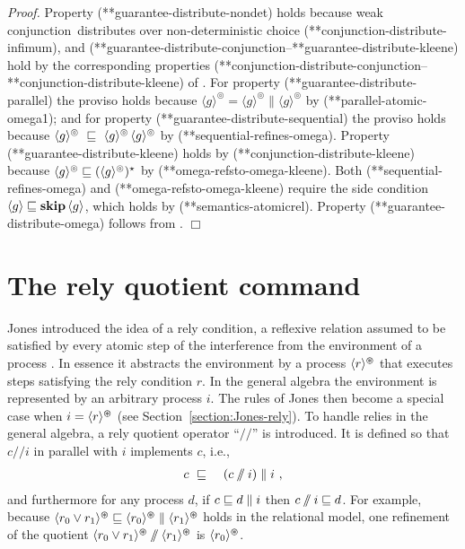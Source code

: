 \documentclass[fleqn]{fac}
\makeatletter
\renewenvironment{proof}{\noindent \textit{Proof.}}{\noindent$\Box$\par}
\def\refaxiom{\@ifnextchar*{\@refaxiom}{\@@refaxiom}}
\def\@refaxiom*#1{\ref{axiom-#1}\index{Axiom!#1|LawUse}}
\def\@@refaxiom#1{axiom~(\ref{axiom-#1})\index{Axiom!#1|LawUse}}
\def\refproperty{\@ifnextchar*{\@refproperty}{\@@refproperty}}
\def\@refproperty*#1{\ref{property-#1}\index{Property!#1|LawUse}}
\def\@@refproperty#1{property~(\ref{property-#1})\index{Property!#1|LawUse}}
\newcommand{\SSeq}{\,}
\newcommand{\atomicrel}[1]{\langle#1\rangle}
\newcommand{\FinSkipIter}{^{\varoast}}
\newcommand{\FinGuar}[1]{\atomicrel{#1}\FinSkipIter}
\newcommand{\omegaskip}{\circledcirc}
\newcommand{\InfSkipIter}{^{\omegaskip}}
\newcommand{\InfGuar}[1]{\atomicrel{#1}\InfSkipIter}
\newcommand{\strictconjunction}{weak conjunction}
\newcommand{\quotient}{\mathbin{/\!\!/}}
\newcommand{\Keyword}[1]{\mathsf{\mathbf{#1}}}
\newcommand{\FinIter}{^{\star}}
\newcommand{\Skip}{\Keyword{skip}}
\makeatother
\begin{document}
\begin{proof}
Property (\refproperty*{guarantee-distribute-nondet}) holds because \strictconjunction\ distributes over non-deterministic choice 
(\refaxiom*{conjunction-distribute-infimum}),
and (\refproperty*{guarantee-distribute-conjunction}--\refproperty*{guarantee-distribute-kleene}) 
hold by the corresponding properties (\refproperty*{conjunction-distribute-conjunction}--\refproperty*{conjunction-distribute-kleene}) of .
For property (\refproperty*{guarantee-distribute-parallel}) the proviso holds 
because $\InfGuar{g} = \InfGuar{g} \parallel \InfGuar{g}$
by (\refproperty*{parallel-atomic-omega1});
and
for property (\refproperty*{guarantee-distribute-sequential}) the proviso holds because
$\InfGuar{g} ~\refsto~ \InfGuar{g} \SSeq \InfGuar{g}$
by (\refproperty*{sequential-refines-omega}).
Property (\refproperty*{guarantee-distribute-kleene}) holds by (\refproperty*{conjunction-distribute-kleene}) 
because $\InfGuar{g} \refsto (\InfGuar{g})\FinIter$ by (\refproperty*{omega-refsto-omega-kleene}).
Both (\refproperty*{sequential-refines-omega}) and (\refproperty*{omega-refsto-omega-kleene})
require the side condition $\atomicrel{g} \refsto \Skip \SSeq \atomicrel{g}$,
which holds by (\refproperty*{semantics-atomicrel}).
Property (\refproperty*{guarantee-distribute-omega}) follows from .
\end{proof}






\section{The rely quotient command}\label{section:rely}

Jones introduced the idea of a rely condition,
a reflexive relation assumed to be satisfied by 
every atomic step of the interference from the environment of a process \cite{jon83a}.
In essence it abstracts the environment by a process $\FinGuar{r}$ 
that executes steps satisfying the rely condition $r$.
In the general algebra the environment is represented by an arbitrary process $i$.
The rules of Jones then become a special case 
when $i = \FinGuar{r}$ (see Section~\ref{section:Jones-rely}).
To handle relies in the general algebra, a rely quotient operator ``$\quotient$'' is introduced.
It is defined so that $c \quotient i$ in parallel with $i$ implements $c$,
i.e.,
\begin{eqnarray}\label{rely-motivation}
  c & ~\refsto~ & (c \quotient i) \parallel i~,
\end{eqnarray}
and furthermore for any process $d$, if $c \mathrel{\sqsubseteq} d \parallel i$ then $c \quotient i \refsto d$.
For example, because $\FinGuar{r_0 \lor r_1} \refsto \FinGuar{r_0} \parallel \FinGuar{r_1}$
holds in the relational model,
one refinement of the quotient $\FinGuar{r_0 \lor r_1} \quotient \FinGuar{r_1}$
is $\FinGuar{r_0}$.
\end{document}
